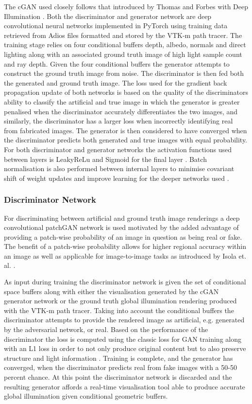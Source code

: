 \documentclass[sigconf]{acmart}%
\begin{document}
The cGAN used closely follows that introduced by Thomas and Forbes with Deep Illumination \cite{deepillum}. Both the discriminator and generator network are deep convolutional neural networks implemented in PyTorch using training data retrieved from Adios files formatted and stored by the VTK-m path tracer. The training stage relies on four conditional buffers depth, albedo, normals and direct lighting along with an associated ground truth image of high light sample count and ray depth. Given the four conditional buffers the generator attempts to construct the ground truth image from noise. The discriminator is then fed both the generated and ground truth image. The loss used for the gradient back propagation update of both networks is based on the quality of the discriminators ability to classify the artificial and true image in which the generator is greater penalised when the discriminator accurately differentiates the two images, and similarly, the discriminator has a larger loss when incorrectly identifying real from fabricated images. The generator is then considered to have converged when the discriminator predicts both generated and true images with equal probability. For both discriminator and generator networks the activation functions used between layers is LeakyReLu and Sigmoid for the final layer \cite{maasLeaky}. Batch normalisation is also performed between internal layers to minimise covariant shift of weight updates and improve learning for the deeper networks used \cite{ioffeBatch}.

\subsubsection{Discriminator Network}

For discriminating between artificial and ground truth image renderings a deep convolutional patchGAN network is used motivated by the added advantage of providing a patch-wise probability of an image in question as being real or fake. The benefit of a patch-wise probability allows for higher regional accuracy within an image as well as applicable for image-to-image tasks as introduced by Isola et. al. \cite{isolaPatch}. 

As input during training the discriminator network is given the set of conditional space buffers along with either the visualisation generated by the cGAN generator network or the ground truth global illumination rendering produced with the VTK-m path tracer. Taking into account the conditional buffers the discriminator attempts to provide the rendered image as artificial, e.g. generated by the adversarial network, or real. Based on the performance of the discriminator the loss is computed using the classic loss for GAN training along with an L1 loss in order to not only produce original content but to also preserve structure and light information \cite{isolaL1}. Training is complete, and the generator has converged, when the discriminator predicts real from fake images with a 50-50 percent chance. At this point the discriminator network is discarded and the resulting generator affords a real-time visualisation tool able to produce accurate global illumination given conditional geometric buffers.
\end{document}
